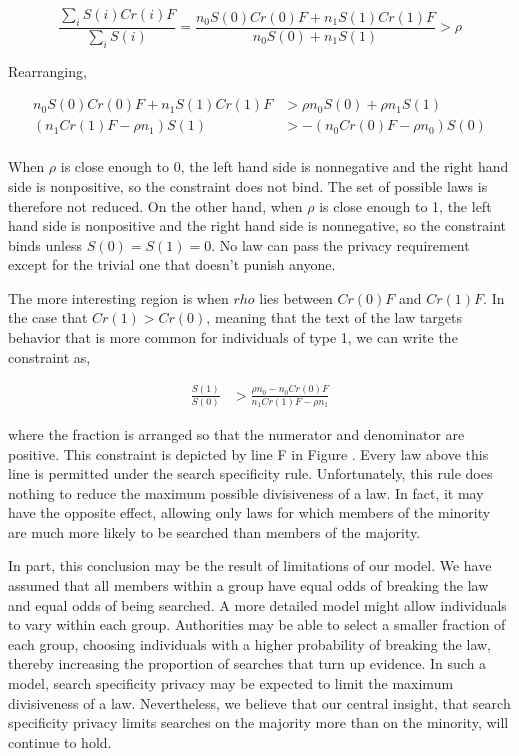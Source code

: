 $$\frac{\sum_i S(i)Cr(i)F}{\sum_i S(i)} = \frac{ n_0 S(0)Cr(0)F + n_1 S(1)Cr(1)F}{n_0 S(0) + n_1 S(1)}  > \rho$$

Rearranging,

\begin{align}
\nonumber n_0 S(0)Cr(0)F + n_1 S(1)Cr(1)F &> \rho n_0 S(0) + \rho n_1 S(1) \\
\nonumber  (n_1 Cr(1)F - \rho n_1 ) S(1) &>  - (n_0 Cr(0)F - \rho n_0 )S(0) \\
\end{align}

When $\rho$ is close enough to 0, the left hand side is nonnegative and the right hand side is nonpositive, so the constraint does not bind.  The set of possible laws is therefore not reduced.  On the other hand, when $\rho$ is close enough to 1, the left hand side is nonpositive and the right hand side is nonnegative, so the constraint binds unless $S(0) = S(1) = 0$.  No law can pass the privacy requirement except for the trivial one that doesn't punish anyone.  

The more interesting region is when $rho$ lies between  $Cr(0)F$ and $Cr(1)F$.  In the case that $Cr(1) > Cr(0)$, meaning that the text of the law targets behavior that is more common for individuals of type 1, we can write the constraint as,

\begin{align}
\frac{S(1)}{S(0)} &>  \frac{\rho n_0 - n_0 Cr(0)F }{n_1 Cr(1)F - \rho n_1}
\end{align}

where the fraction is arranged so that the numerator and denominator are positive.  This constraint is depicted by line F in Figure .  Every law above this line is permitted under the search specificity rule.  Unfortunately, this rule does nothing to reduce the maximum possible divisiveness of a law.  In fact, it may have the opposite effect, allowing only laws for which members of the minority are much more likely to be searched than members of the majority.

In part, this conclusion may be the result of limitations of our model.  We have assumed that all members within a group have equal odds of breaking the law and equal odds of being searched.  A more detailed model might allow individuals to vary within each group.  Authorities may be able to select a smaller fraction of each group, choosing individuals with a higher probability of breaking the law, thereby increasing the proportion of searches that turn up evidence.  In such a model, search specificity privacy may be expected to limit the maximum divisiveness of a law.  Nevertheless, we believe that our central insight, that search specificity privacy limits searches on the majority more than on the minority, will continue to hold.






